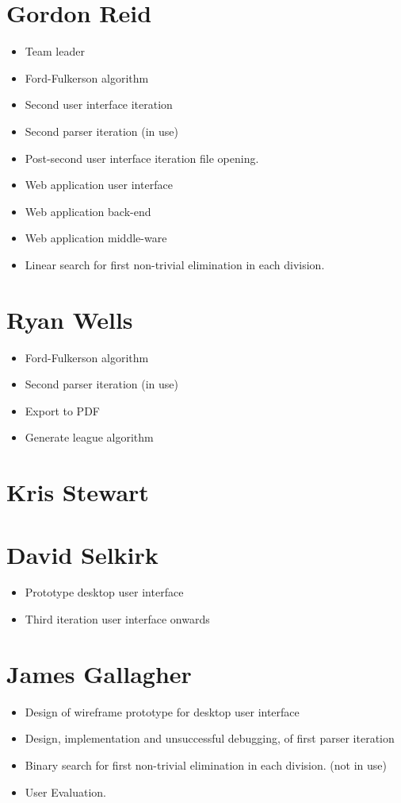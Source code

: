 \section{Gordon Reid}

\begin{itemize}
\item Team leader
\item Ford-Fulkerson algorithm
\item Second user interface iteration
\item Second parser iteration (in use)
\item Post-second user interface iteration file opening.
\item Web application user interface
\item Web application back-end
\item Web application middle-ware
\item Linear search for first non-trivial elimination in each division.
\end{itemize}

\section{Ryan Wells}

\begin{itemize}
\item Ford-Fulkerson algorithm
\item Second parser iteration (in use)
\item Export to PDF
\item Generate league algorithm
\end{itemize}

\section{Kris Stewart}

\section{David Selkirk}

\begin{itemize}
\item Prototype desktop user interface
\item Third iteration user interface onwards
\end{itemize}

\section{James Gallagher}

\begin{itemize}
\item Design of wireframe prototype for desktop user interface
\item Design, implementation and unsuccessful debugging, of first parser iteration
\item Binary search for first non-trivial elimination in each division. (not in use)
\item User Evaluation. 

 
\end{itemize}
